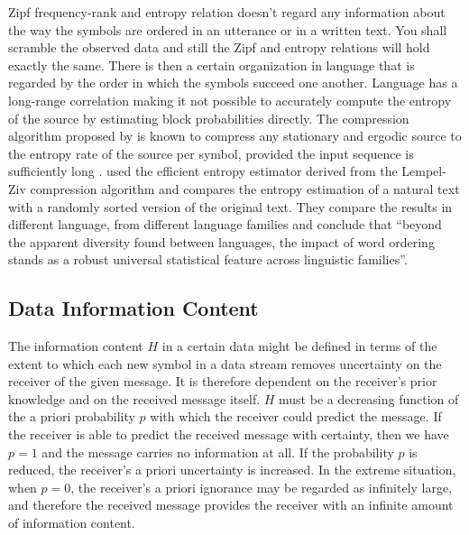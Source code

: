 Zipf frequency-rank and entropy relation doesn't regard any information about the way the symbols
are ordered in an utterance or in a written text. You shall scramble the observed data
and still the Zipf and entropy relations will hold exactly the same.
There is then a certain organization in language that is regarded by the order in
which the symbols succeed one another. 
Language has a long-range correlation making it not possible to accurately compute 
the entropy of the source by estimating block probabilities directly.
The compression algorithm proposed by \cite{lempelziv1978} is known to compress
any stationary and ergodic source to the entropy rate of the source per symbol,
provided the input sequence is sufficiently long \cite{coverthomas1991}.
\cite{montemurro2011} used the efficient entropy
estimator derived from the Lempel-Ziv compression algorithm
and compares the entropy estimation of a natural text with a randomly sorted version 
of the original text. They compare the results in different language, from
different language families and conclude that ``beyond the apparent
diversity found between languages, the impact of word ordering
stands as a robust universal statistical feature across linguistic
families''\citep{montemurro2011}.





\subsection{Data Information Content}
The information content $H$ in a certain data might be defined in terms of the extent
to which each new symbol in a data stream removes uncertainty on the receiver of
the given message. It is therefore dependent on the receiver's
prior knowledge and on the received message itself. $H$ 
must be a decreasing function of the a priori probability $p$ with which the receiver 
could predict the message. If the receiver is able to predict the received message
with certainty, then we have $p=1$ and the message carries no information at all.
If the probability $p$ is reduced, the receiver's a priori uncertainty is increased.
In the extreme situation, when $p=0$, the receiver's a priori ignorance may be regarded
as infinitely large, and therefore the received message provides the receiver with
an infinite amount of information content. 

